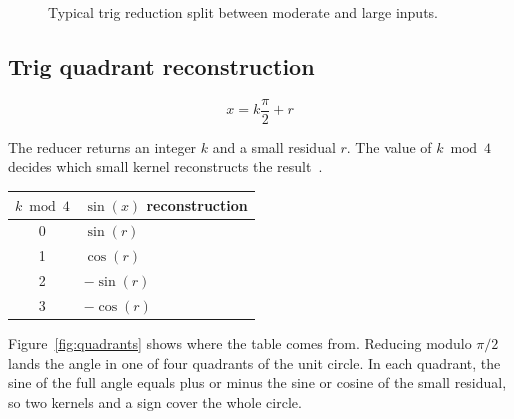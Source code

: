 \documentclass[manuscript, nonacm]{acmart}
\begin{document}
  \begin{figure}[tbp]
    \centering
    \caption{Typical trig reduction split between moderate and large inputs.}
  \end{figure}

  \subsection{Trig quadrant reconstruction}

  \[ x = k\frac{\pi}{2} + r \]

  The reducer returns an integer $k$ and a small residual $r$. The value of
  $k \bmod 4$ decides which small kernel reconstructs the result~\cite{muller}.

  \begin{table}[tbp]
    \centering
    \begin{tabular}{cl}
      \toprule
      $k \bmod 4$ & $\sin(x)$ reconstruction \\
      \midrule
      0           & $\sin(r)$                \\
      1           & $\cos(r)$                \\
      2           & $-\sin(r)$               \\
      3           & $-\cos(r)$               \\
      \bottomrule
    \end{tabular}
  \end{table}

  Figure~\ref{fig:quadrants} shows where the table comes from. Reducing
  modulo $\pi/2$ lands the angle in one of four quadrants of the unit
  circle. In each quadrant, the sine of the full angle equals plus or
  minus the sine or cosine of the small residual, so two kernels and a sign
  cover the whole circle.
\end{document}

